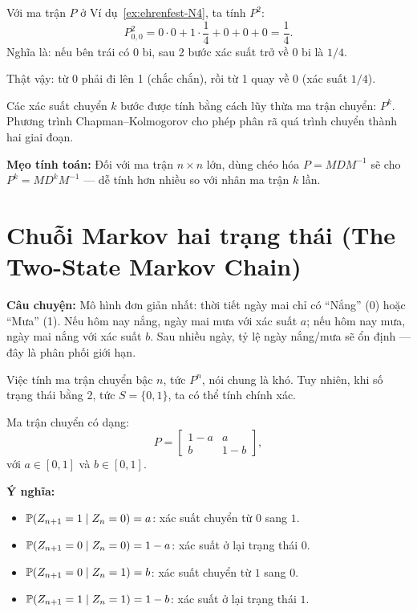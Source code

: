 \begin{example}[Tính $P^n$ cho chuỗi Ehrenfest $N = 4$]
\label{ex:Pn-ehrenfest}
Với ma trận $P$ ở Ví dụ~\ref{ex:ehrenfest-N4}, ta tính $P^2$:
\[
  P^2_{0,0} = 0 \cdot 0 + 1 \cdot \frac{1}{4} + 0 + 0 + 0 = \frac{1}{4}.
\]
Nghĩa là: nếu bên trái có 0 bi, sau 2 bước xác suất trở về 0 bi là $1/4$.

Thật vậy: từ 0 phải đi lên 1 (chắc chắn), rồi từ 1 quay về 0 (xác suất $1/4$).
\end{example}

\begin{tomtat}
Các xác suất chuyển $k$ bước được tính bằng cách lũy thừa ma trận chuyển: $P^k$.
Phương trình Chapman--Kolmogorov cho phép phân rã quá trình chuyển thành hai giai đoạn.

\textbf{Mẹo tính toán:} Đối với ma trận $n \times n$ lớn, dùng chéo hóa $P = M D M^{-1}$
sẽ cho $P^k = M D^k M^{-1}$ --- dễ tính hơn nhiều so với nhân ma trận $k$ lần.
\end{tomtat}

\section{Chuỗi Markov hai trạng thái (The Two-State Markov Chain)}
\label{sec:two-state}

\textbf{Câu chuyện:} Mô hình đơn giản nhất: thời tiết ngày mai chỉ có ``Nắng'' (0) hoặc ``Mưa'' (1).
Nếu hôm nay nắng, ngày mai mưa với xác suất $a$; nếu hôm nay mưa, ngày mai nắng với xác suất $b$.
Sau nhiều ngày, tỷ lệ ngày nắng/mưa sẽ ổn định --- đây là phân phối giới hạn.

Việc tính ma trận chuyển bậc $n$, tức $P^n$, nói chung là khó. Tuy nhiên, khi số trạng thái bằng 2, tức $S = \{0, 1\}$, ta có thể tính chính xác.

Ma trận chuyển có dạng:
\begin{equation}\label{eq:two-state}
  P = \begin{bmatrix} 1-a & a \\ b & 1-b \end{bmatrix},
\end{equation}
với $a \in [0,1]$ và $b \in [0,1]$.

\textbf{Ý nghĩa:}
\begin{itemize}[nosep]
  \item $\mathbb{P}(Z_{n+1} = 1 \mid Z_n = 0) = a$: xác suất chuyển từ $0$ sang $1$.
  \item $\mathbb{P}(Z_{n+1} = 0 \mid Z_n = 0) = 1-a$: xác suất ở lại trạng thái $0$.
  \item $\mathbb{P}(Z_{n+1} = 0 \mid Z_n = 1) = b$: xác suất chuyển từ $1$ sang $0$.
  \item $\mathbb{P}(Z_{n+1} = 1 \mid Z_n = 1) = 1-b$: xác suất ở lại trạng thái $1$.
\end{itemize}

